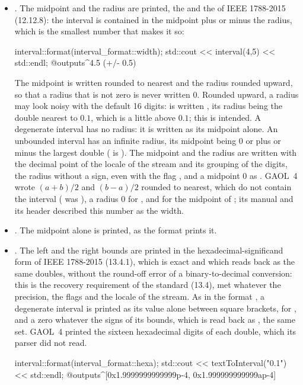 \documentclass[12pt,a4paper,twoside,openright]{book}
\begin{document}
\begin{itemize}
\item[$\bullet$] . The midpoint and the radius are printed,
the  and the  of IEEE 1788-2015 (12.12.8): the
interval is contained in the midpoint plus or minus the radius, which is
the smallest number that makes it so:
\begin{example}
 interval::format(interval_format::width);
 std::cout << interval(4,5) << std::endl;
 @outputs^4.5 (+/- 0.5)~
\end{example}
The midpoint is written rounded to nearest and the radius rounded upward,
so that a radius that is not zero is never written 0. Rounded upward, a
radius may look noisy with the default 16 digits:  is written
, its radius being the double nearest to
$0.1$, which is a little above $0.1$; this is intended. A degenerate
interval has no radius: it is written as its midpoint alone. An unbounded
interval has an infinite radius, its midpoint being $0$ or plus or minus
the largest double (\code{[3, inf]} is
). The midpoint and the radius are
written with the decimal point of the locale of the stream and its grouping
of the digits, the radius without a sign, even with the flag
, and a midpoint $0$ as .\newinvfive{} GAOL~4 wrote
$(a+b)/2$ and $(b-a)/2$ rounded to nearest, which do not contain the
interval ( was ), a radius 0 for
, and  for the midpoint of
; its manual and its header described this
number as the width.

\item[$\bullet$] . The midpoint alone is printed, as the
format  prints it.\newinvfive

\item[$\bullet$] . The left and the right bounds are printed
in the hexadecimal-significand form of IEEE 1788-2015 (13.4.1), which is
exact and which  reads back as the same doubles,
without the round-off error of a binary-to-decimal conversion: this is the
recovery requirement of the standard (13.4), met whatever the precision,
the flags and the locale of the stream. As in the format ,
a degenerate interval is printed as its value alone between square
brackets, \code{[0x1.8p+0]} for , and a zero
\code{[0x0p+0]} whatever the signs of its bounds, which is read back as
, the same set. GAOL~4 printed the sixteen hexadecimal digits
of each double, which its parser did not read.\newinvfive
{}%
\begin{example}
 interval::format(interval_format::hexa);
 std::cout << textToInterval("0.1") << std::endl;
 @outputs^[0x1.9999999999999p-4, 0x1.999999999999ap-4]~
\end{example}
\end{itemize}
\end{document}
